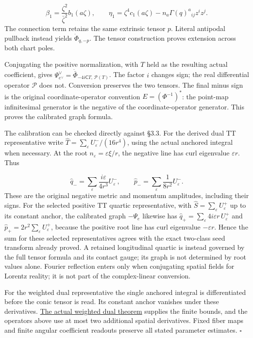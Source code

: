 \documentclass[
  english,
  11pt,
  reqno]{amsart}
\begin{document}
\label{eq:online-opposite-polarization-conversion} \[
\beta_1=\frac{\zeta^2}{\bar\zeta^2}b_1(a\zeta),\qquad
\eta_1=\zeta^4c_1(a\zeta)
       -n_a\Gamma(q)^a{}_{ij}z^iz^j.
\] The connection term retains the same extrinsic tensor \(p\). Literal
antipodal pullback instead yields \(\dot\Phi_{q,-p}\). The tensor
construction proves extension across both chart poles.

Conjugating the positive normalization, with \(T\) held as the resulting
actual coefficient, gives
\(\Psi^\vee_{e^\vee}=\dot{\bar\Phi}_{-4i\mathsf CT,\,\mathcal P(T)}\).
The factor \(i\) changes sign; the real differential operator
\(\mathcal P\) does not. Conversion preserves the two tensors. The final
minus sign is the original coordinate-operator convention
\(E=(\Phi^{-1})^*\): the point-map infinitesimal generator is the
negative of the coordinate-operator generator. This proves the
calibrated graph formula.

The calibration can be checked directly against §3.3. For the derived
dual TT representative write
\(\widehat T=\sum_{\varepsilon}U^-_\varepsilon/(16r^4)\), using the
actual anchored integral when necessary. At the root
\(n_\varepsilon=\varepsilon\xi/r\), the negative line has curl
eigenvalue \(\varepsilon r\). Thus

\label{eq:online-negative-graph-residue-calibration} \[
\widehat q_-=\sum_\varepsilon\frac{i\varepsilon}{4r^3}U^-_\varepsilon,
\qquad
\widehat p_-=\sum_\varepsilon\frac1{8r^2}U^-_\varepsilon.
\] These are the original negative metric and momentum amplitudes,
including their signs. For the selected positive TT quartic
representative, with \(\widehat S=\sum_\varepsilon U^+_\varepsilon\) up
to its constant anchor, the calibrated graph \(-\Psi_e\) likewise has
\(\widehat q_+=\sum_\varepsilon4i\varepsilon r\,U^+_\varepsilon\) and
\(\widehat p_+=2r^2\sum_\varepsilon U^+_\varepsilon\), because the
positive root line has curl eigenvalue \(-\varepsilon r\). Hence the sum
for these selected representatives agrees with the exact two-class seed
transform already proved. A retained longitudinal quartic is instead
governed by the full tensor formula and its contact gauge; its graph is
not determined by root values alone. Fourier reflection enters only when
conjugating spatial fields for Lorentz reality; it is not part of the
complex-linear conversion.

For the weighted dual representative the single anchored integral is
differentiated before the conic tensor is read. Its constant anchor
vanishes under these derivatives.
\hyperref[thm:online-actual-weighted-negative-dual]{The actual weighted
dual theorem} supplies the finite bounds, and the operators above use at
most two additional spatial derivatives. Fixed fiber maps and finite
angular coefficient readouts preserve all stated parameter estimates.
\hfill\(\square\)
\end{document}
